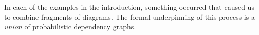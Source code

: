 \documentclass{article}
\newcommand{\modelname}{probabilistic dependency graph}
\newcommand{\modelnames}{\modelname s}
\numberwithin{equation}{section}
\begin{document}
\begin{notfocus}
{%
	In each of the examples in the introduction, something occurred that caused us to combine fragments of diagrams. The formal underpinning of this process is a \emph{union} of \modelnames.

}
\end{notfocus}
\end{document}
